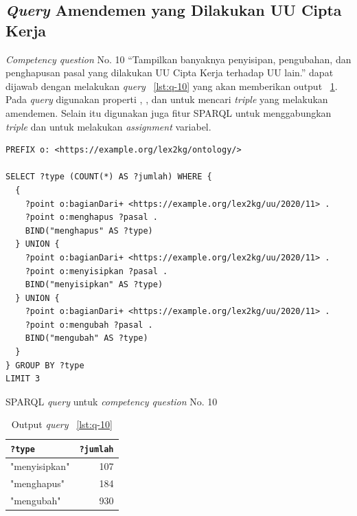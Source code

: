 \subsection{\textit{Query} Amendemen yang Dilakukan UU Cipta Kerja}
\label{subsec:cq8}
\textit{Competency question} No. 10 ``Tampilkan banyaknya penyisipan, pengubahan, dan penghapusan
pasal yang dilakukan UU Cipta Kerja terhadap UU lain.'' dapat dijawab dengan melakukan
\textit{query} \lst~\ref{lst:q-10} yang akan memberikan output \tab~\ref{tab:output-q-10}. Pada
\textit{query} digunakan properti , , dan 
untuk mencari \textit{triple} yang melakukan amendemen. Selain itu digunakan juga fitur SPARQL
 untuk menggabungkan \textit{triple} dan  untuk melakukan \textit{assignment}
variabel.

\begin{listing}[H]
  \begin{verbatim}
PREFIX o: <https://example.org/lex2kg/ontology/>

SELECT ?type (COUNT(*) AS ?jumlah) WHERE {
  {
    ?point o:bagianDari+ <https://example.org/lex2kg/uu/2020/11> .
    ?point o:menghapus ?pasal .
    BIND("menghapus" AS ?type)
  } UNION {
    ?point o:bagianDari+ <https://example.org/lex2kg/uu/2020/11> .
    ?point o:menyisipkan ?pasal .
    BIND("menyisipkan" AS ?type)
  } UNION {
    ?point o:bagianDari+ <https://example.org/lex2kg/uu/2020/11> .
    ?point o:mengubah ?pasal .
    BIND("mengubah" AS ?type)
  }
} GROUP BY ?type
LIMIT 3
  \end{verbatim}
  \caption{SPARQL \textit{query} untuk \textit{competency question} No. 10}
  \label{lst:q-10}
\end{listing}

\begin{table}
  \centering
  \begin{tabular}{|l|r|} \hline
    \texttt{?type} & \texttt{?jumlah} \\\hline \hline
    "menyisipkan"  & 107              \\\hline
    "menghapus"    & 184              \\\hline
    "mengubah"     & 930              \\\hline
  \end{tabular}
  \caption{Output \textit{query} \lst~\ref{lst:q-10} }
  \label{tab:output-q-10}
\end{table}


